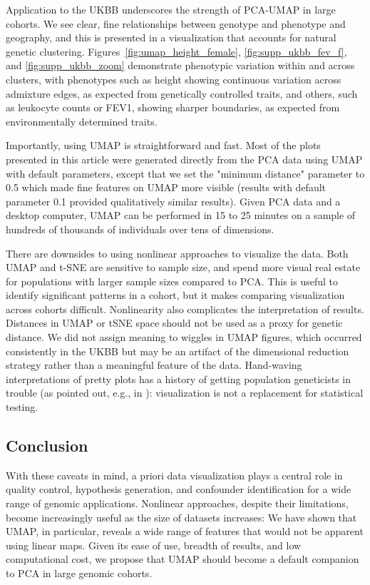 \documentclass[12pt]{pnas-new}
\begin{document}
Application to the UKBB underscores the strength of PCA-UMAP in large cohorts. We see clear, fine relationships between genotype and phenotype and geography, and this is presented in a visualization that accounts for natural genetic clustering. Figures~\ref{fig:umap_height_female}, \ref{fig:supp_ukbb_fev_f}, and \ref{fig:supp_ukbb_zoom} demonstrate phenotypic variation within and across clusters, with phenotypes such as height showing continuous variation across admixture edges, as expected from genetically controlled traits, and others, such as leukocyte counts or FEV1, showing sharper boundaries, as expected from environmentally determined traits.  

Importantly, using UMAP is straightforward and fast. Most of the plots presented in this article were generated directly from the PCA data using UMAP with default parameters, except that we set the "minimum distance" parameter to 0.5 which made fine features on UMAP more visible (results with default parameter 0.1 provided qualitatively similar results). Given PCA data and a desktop computer, UMAP can be performed in 15 to 25 minutes on a sample of hundreds of thousands of individuals over tens of dimensions. 

There are downsides to using nonlinear approaches to visualize the data. Both UMAP and t-SNE are sensitive to sample size, and spend more visual real estate for populations with larger sample sizes compared to PCA. This is useful to identify significant patterns in a cohort, but it makes comparing visualization across cohorts difficult. Nonlinearity also complicates the interpretation of results. Distances in UMAP or tSNE space should not be used as a proxy for genetic distance. We did not assign meaning to wiggles in UMAP figures, which occurred consistently in the UKBB but may be an artifact of the dimensional reduction strategy rather than a meaningful feature of the data. Hand-waving interpretations of pretty plots has a history of getting population geneticists in trouble (as pointed out, e.g., in \cite{novembre2008interpreting}): visualization is not a replacement for statistical testing.       

\subsection*{Conclusion}
With these caveats in mind, a priori data visualization plays a central role in quality control, hypothesis generation, and confounder identification for a wide range of genomic applications. Nonlinear approaches, despite their limitations, become increasingly useful as the size of datasets increases: We have shown that UMAP, in particular, reveals a wide range of features that would not be apparent using linear maps. Given its ease of use, breadth of results, and low computational cost, we propose that UMAP should become a default companion to PCA in large genomic cohorts.
\end{document}
